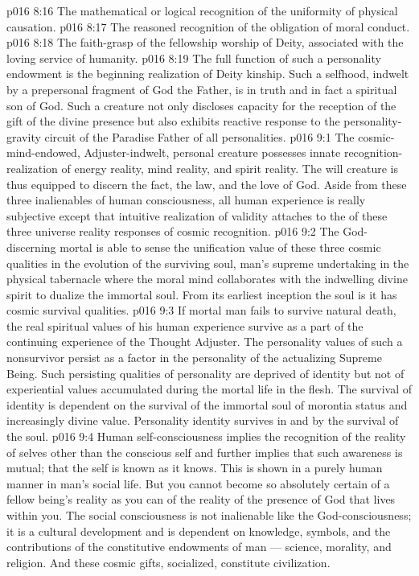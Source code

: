 \vs p016 8:16 \bibnobreakspace The mathematical or logical recognition of the uniformity of physical causation.
\vs p016 8:17 \bibnobreakspace The reasoned recognition of the obligation of moral conduct.
\vs p016 8:18 \bibnobreakspace The faith\hyp{}grasp of the fellowship worship of Deity, associated with the loving service of humanity.
\vs p016 8:19 \pc The full function of such a personality endowment is the beginning realization of Deity kinship. Such a selfhood, indwelt by a prepersonal fragment of God the Father, is in truth and in fact a spiritual son of God. Such a creature not only discloses capacity for the reception of the gift of the divine presence but also exhibits reactive response to the personality\hyp{}gravity circuit of the Paradise Father of all personalities.
\vs p016 9:1 The cosmic\hyp{}mind\hyp{}endowed, Adjuster\hyp{}indwelt, personal creature possesses innate recognition\hyp{}realization of energy reality, mind reality, and spirit reality. The will creature is thus equipped to discern the fact, the law, and the love of God. Aside from these three inalienables of human consciousness, all human experience is really subjective except that intuitive realization of validity attaches to the  of these three universe reality responses of cosmic recognition.
\vs p016 9:2 The God\hyp{}discerning mortal is able to sense the unification value of these three cosmic qualities in the evolution of the surviving soul, man’s supreme undertaking in the physical tabernacle where the moral mind collaborates with the indwelling divine spirit to dualize the immortal soul. From its earliest inception the soul is  it has cosmic survival qualities.
\vs p016 9:3 If mortal man fails to survive natural death, the real spiritual values of his human experience survive as a part of the continuing experience of the Thought Adjuster. The personality values of such a nonsurvivor persist as a factor in the personality of the actualizing Supreme Being. Such persisting qualities of personality are deprived of identity but not of experiential values accumulated during the mortal life in the flesh. The survival of identity is dependent on the survival of the immortal soul of morontia status and increasingly divine value. Personality identity survives in and by the survival of the soul.
\vs p016 9:4 \pc Human self\hyp{}consciousness implies the recognition of the reality of selves other than the conscious self and further implies that such awareness is mutual; that the self is known as it knows. This is shown in a purely human manner in man’s social life. But you cannot become so absolutely certain of a fellow being’s reality as you can of the reality of the presence of God that lives within you. The social consciousness is not inalienable like the God\hyp{}consciousness; it is a cultural development and is dependent on knowledge, symbols, and the contributions of the constitutive endowments of man --- science, morality, and religion. And these cosmic gifts, socialized, constitute civilization.
